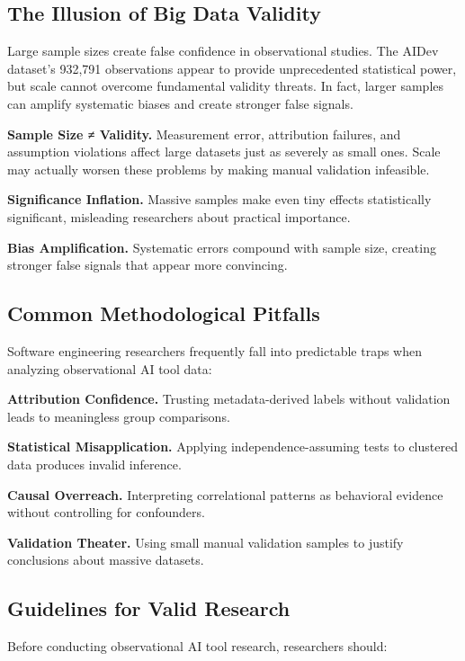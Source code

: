 \documentclass[conference]{IEEEtran}
\begin{document}
\subsection{The Illusion of Big Data Validity}

Large sample sizes create false confidence in observational studies. The AIDev dataset's 932,791 observations appear to provide unprecedented statistical power, but scale cannot overcome fundamental validity threats. In fact, larger samples can amplify systematic biases and create stronger false signals.

\textbf{Sample Size ≠ Validity.} Measurement error, attribution failures, and assumption violations affect large datasets just as severely as small ones. Scale may actually worsen these problems by making manual validation infeasible.

\textbf{Significance Inflation.} Massive samples make even tiny effects statistically significant, misleading researchers about practical importance.

\textbf{Bias Amplification.} Systematic errors compound with sample size, creating stronger false signals that appear more convincing.

\subsection{Common Methodological Pitfalls}

Software engineering researchers frequently fall into predictable traps when analyzing observational AI tool data:

\textbf{Attribution Confidence.} Trusting metadata-derived labels without validation leads to meaningless group comparisons.

\textbf{Statistical Misapplication.} Applying independence-assuming tests to clustered data produces invalid inference.

\textbf{Causal Overreach.} Interpreting correlational patterns as behavioral evidence without controlling for confounders.

\textbf{Validation Theater.} Using small manual validation samples to justify conclusions about massive datasets.

\subsection{Guidelines for Valid Research}

Before conducting observational AI tool research, researchers should:
\end{document}
